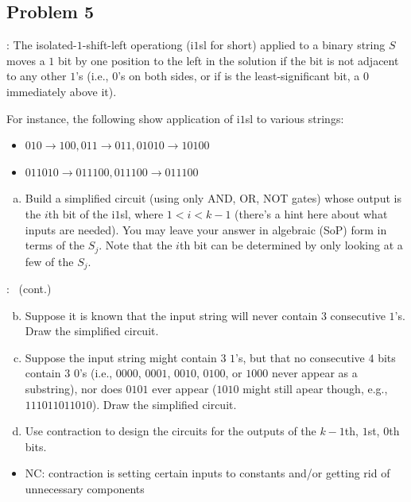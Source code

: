\documentclass{../slides}
\begin{document}
\subsection{Problem 5}
\begin{frame}{\secname: \subsecname}
    The isolated-$1$-shift-left operationg (i$1$sl for short) applied to a binary string $S$ moves a $1$ bit by one position to the left in the solution if the bit is not adjacent to any other $1$'s (i.e., $0$'s on both sides, or if is the least-significant bit, a $0$ immediately above it).

    For instance, the following show application of i$1$sl to various strings:
    \begin{itemize}
        \item $010\to 100, 011\to 011, 01010\to 10100$
        \item $011010\to 011100, 011100\to 011100$
    \end{itemize}
    \begin{enumerate}[(a)]
        \item Build a simplified circuit (using only AND, OR, NOT gates) whose output is the $i$th bit of the i$1$sl, where $1 < i < k-1$ (there's a hint here about what inputs are needed). You may leave your answer in algebraic (SoP) form in terms of the $S_j$. Note that the $i$th bit can be determined by only looking at a few of the $S_j$.
    \end{enumerate}
\end{frame}

\begin{frame}{\secname: \subsecname\ (cont.)}
    \begin{enumerate}[(a)]
    \setcounter{enumi}{1}
        \item Suppose it is known that the input string will never contain $3$ consecutive $1$'s. Draw the simplified circuit.
        \item Suppose the input string might contain $3$ $1$'s, but that no consecutive $4$ bits contain $3$ $0$'s (i.e., $0000$, $0001$, $0010$, $0100$, or $1000$ never appear as a substring), nor does $0101$ ever appear ($1010$ might still apear though, e.g., $111011011010$). Draw the simplified circuit.
        \item Use contraction to design the circuits for the outputs of the $k-1$th, $1$st, $0$th bits.
    \end{enumerate}
    \begin{itemize}
        \item NC: contraction is setting certain inputs to constants and/or getting rid of unnecessary components
    \end{itemize}
\end{frame}
\end{document}
